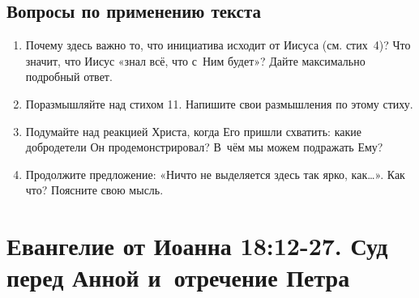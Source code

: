 \documentclass[a4paper,12pt]{article}
\begin{document}
\subsection*{Вопросы по применению текста} 
\begin{enumerate}
    \item Почему здесь важно то, что инициатива исходит от Иисуса (см. стих~4)? Что значит, что Иисус «знал всё, что с~Ним будет»? Дайте максимально подробный ответ. 
    
    \myline
    
    \myline
    \item Поразмышляйте над стихом 11. Напишите свои размышления по этому стиху. 
    
    \myline
    
    \myline
    \item Подумайте над реакцией Христа, когда Его пришли схватить: какие добродетели Он продемонстрировал? В~чём мы можем подражать Ему? 
    
    \myline
    
    \myline
    \item Продолжите предложение: «Ничто не выделяется здесь так ярко, как…». Как что? Поясните свою мысль.
    
    \myline
    
    \myline
\end{enumerate}



\section{Евангелие от Иоанна 18:12-27. Суд перед Анной и~отречение Петра}
\end{document}
